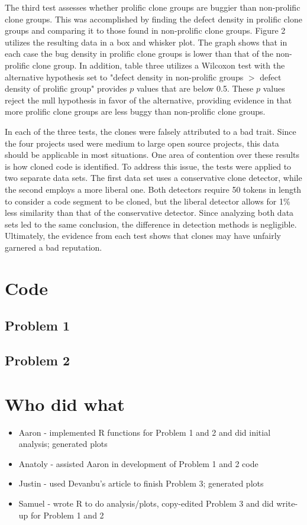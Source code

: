\documentclass{article}
\begin{document}
The third test assesses whether prolific clone groups are buggier than non-prolific clone groups.
This was accomplished by finding the defect density in prolific clone groups and comparing it to
those found in non-prolific clone groups. Figure 2 utilizes the resulting data in a box and whisker
plot. The graph shows that in each case the bug density in prolific clone groups is lower than that
of the non-prolific clone group. In addition, table three utilizes a Wilcoxon test with the alternative
hypothesis set to "defect density in non-prolific groups $>$ defect density of prolific group" provides
$p$ values that are below 0.5. These $p$ values reject the null hypothesis in favor of the alternative,
providing evidence in that more prolific clone groups are less buggy than non-prolific clone groups.

In each of the three tests, the clones were falsely attributed to a bad trait. Since the four
projects used were medium to large open source projects, this data should be applicable
in most situations. One area of contention over these results is how cloned code is identified.
To address this issue, the tests were applied to two separate data sets. The first data set
uses a conservative clone detector, while the second employs a more liberal one. Both detectors
require 50 tokens in length to consider a code segment to be cloned, but the liberal detector
allows for 1\% less similarity than that of the conservative detector. Since analyzing both
data sets led to the same conclusion, the difference in detection methods is negligible. Ultimately,
the evidence from each test shows that clones may have unfairly garnered a bad reputation.

\pagebreak

\appendix
\section{Code}
\subsection{Problem 1}

\subsection{Problem 2}


\section{Who did what}
\begin{itemize}
	\item Aaron - implemented R functions for Problem 1 and 2 and did initial analysis; generated plots
	\item Anatoly - assisted Aaron in development of Problem 1 and 2 code
	\item Justin - used Devanbu's article to finish Problem 3; generated plots
	\item Samuel - wrote R to do analysis/plots, copy-edited Problem 3 and did write-up for Problem 1 and 2
\end{itemize}
\end{document}
